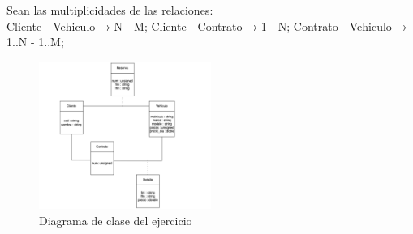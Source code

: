  Sean las multiplicidades de las relaciones:\\
Cliente - Vehiculo → N - M; Cliente - Contrato → 1 - N; Contrato - Vehiculo → 1..N - 1..M;
\begin{figure}[h]
  \begin{center}
    \includegraphics[width=0.5\textwidth]{assets/Junio2022_1.png}
  \end{center}
  \caption{Diagrama de clase del ejercicio}
\end{figure}

